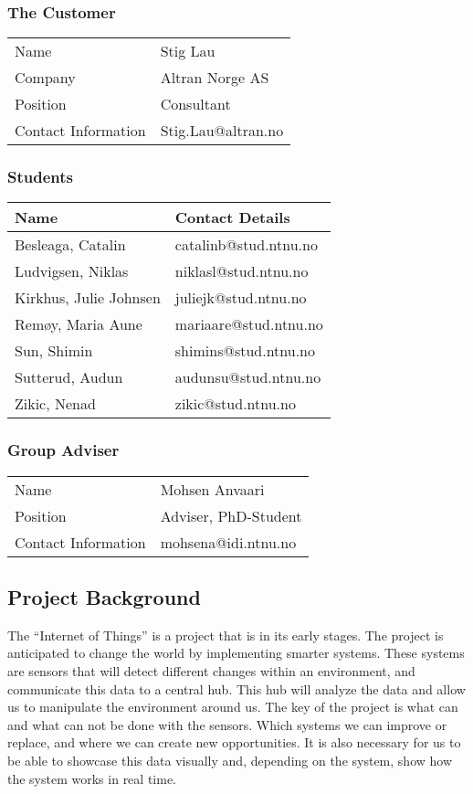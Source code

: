 \documentclass[../document.tex]{subfiles}
\begin{document}
\subsubsection{The Customer}
\begin{tabular}{ll}
\hline
Name					&	Stig Lau\\
Company				&	\gls{Altran} Norge AS\\
Position				&	Consultant\\
Contact Information		&	Stig.Lau@altran.no\\
\hline
\end{tabular}

\subsubsection{Students}
\begin{tabular}{ll}
\hline
Name				&	Contact Details\\ \hline
Besleaga, Catalin		&	catalinb@stud.ntnu.no\\
Ludvigsen, Niklas		&	niklasl@stud.ntnu.no\\
Kirkhus, Julie Johnsen	&	juliejk@stud.ntnu.no\\
Remøy, Maria Aune		&	mariaare@stud.ntnu.no\\
Sun, Shimin			&	shimins@stud.ntnu.no\\
Sutterud, Audun		&	audunsu@stud.ntnu.no\\
Zikic, Nenad			&	zikic@stud.ntnu.no\\
\hline
\end{tabular}

\subsubsection{Group Adviser}
\begin{tabular}{ll}
\hline
Name				&	Mohsen Anvaari\\
Position			&	Adviser, PhD-Student\\
Contact Information	&	mohsena@idi.ntnu.no\\
\hline
\end{tabular}

\subsection{Project Background}
The “Internet of Things” is a project that is in its early stages. The project is anticipated to change the world by implementing smarter systems. These systems are sensors that will detect different changes within an environment, and communicate this data to a central hub. This hub will analyze the data and allow us to manipulate the environment around us. The key of the project is what can and what can not be done with the sensors. Which systems we can improve or replace, and where we can create new opportunities. It is also necessary for us to be able to showcase this data visually and, depending on the system, show how the system works in real time.
\end{document}
